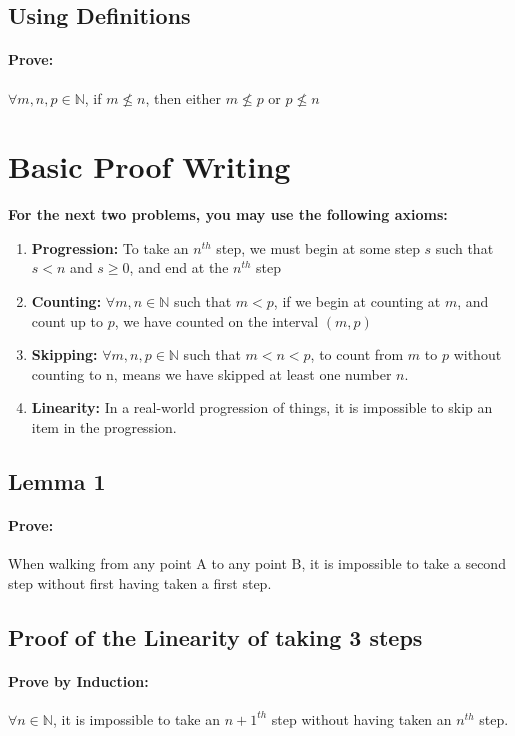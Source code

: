 \documentclass[12pt]{article}
\begin{document}
		\subsection{Using Definitions}
		\paragraph{Prove: } $\forall m,n,p\in\mathbb{N}$, if $m\nleq n$, then either $m\nleq p$ or $p \nleq n$
		
		\newpage
	\section{Basic Proof Writing}
		\textbf{For the next two problems, you may use the following axioms:}
		\begin{enumerate}
			\item \textbf{Progression: } To take an $n^{th}$ step, we must begin at some step $s$ such that $s<n$ and $s\geq 0$, and end at the $n^{th}$ step
			\item \textbf{Counting: } $\forall m,n\in\mathbb{N}$ such that $m<p$, if we begin at counting at $m$, and count up to $p$, we have counted on the interval $(m,p)$
			\item\textbf{Skipping: } $\forall m,n,p\in\mathbb{N}$ such that $m<n<p$, to count from $m$ to $p$ without counting to n, means we have skipped at least one number $n$.
			\item\textbf{Linearity: } In a real-world progression of things, it is impossible to skip an item in the progression.
		\end{enumerate}
		\subsection{Lemma 1}
		\paragraph{Prove:} When walking from any point A to any point B, it is impossible to take a second step without first having taken a first step.
		\subsection{Proof of the Linearity of taking 3 steps}
		\paragraph{Prove by Induction:} $\forall n\in\mathbb{N}$, it is impossible to take an $n+1^{th}$ step without having taken an $n^{th}$ step.\newline
\end{document}
